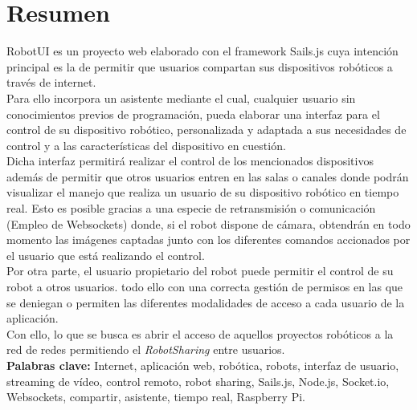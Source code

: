

\section*{Resumen}
\label{resumen}

RobotUI es un proyecto web elaborado con el framework Sails.js cuya intención principal es la de permitir que usuarios compartan sus dispositivos robóticos a través de internet.\\

Para ello incorpora un asistente mediante el cual, cualquier usuario sin conocimientos previos de programación, pueda elaborar una interfaz para el control de su dispositivo robótico, personalizada y
adaptada a sus necesidades de control y a las características del dispositivo en cuestión.\\

Dicha interfaz permitirá realizar el control de los mencionados dispositivos además de permitir que otros usuarios entren en las salas o canales donde podrán visualizar el manejo 
que realiza un usuario de su dispositivo robótico en tiempo real. Esto es posible gracias a una especie de retransmisión o comunicación (Empleo de Websockets) donde, si el robot dispone de cámara, obtendrán en todo momento las imágenes captadas 
junto con los diferentes comandos accionados por el usuario que está realizando el control.\\

Por otra parte, el usuario propietario del robot puede permitir el control de su robot a otros usuarios. todo ello con una correcta gestión de permisos en las que se deniegan o permiten 
las diferentes modalidades de acceso a cada usuario de la aplicación.\\

Con ello, lo que se busca es abrir el acceso de aquellos proyectos robóticos a la red de redes permitiendo el \emph{RobotSharing} entre usuarios.\\


\textbf{Palabras clave:} Internet, aplicación web, robótica, robots, interfaz de usuario, streaming de vídeo, control remoto, robot sharing, Sails.js, Node.js, Socket.io, Websockets, compartir, 
asistente, tiempo real, Raspberry Pi.
